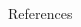 \documentclass[final,hyperref={pdfpagelabels=false}, 11pt]{beamer}
\begin{document}
\begin{frame}[t]
\begin{columns}[t]
\begin{column}{.47\textwidth}
\begin{block}{\small{References}}
\end{block}

\end{column} %
\begin{column}{.01\textwidth}\end{column} %
\end{columns} %

\end{frame} %
\end{document}
